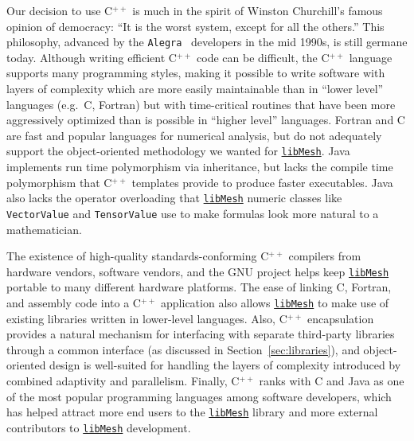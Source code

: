 \documentclass[global,twocolumn,final]{svjour}
\newcommand{\libMesh}{\href{http://libmesh.sourceforge.net}{\texttt{lib\-Mesh}}}
\newcommand{\cpp}{C{\tiny$^{++}$}}
\newcommand{\ICESOnly}[1]{}     %
\begin{document}
Our decision to use \cpp{} is much in the spirit of Winston
Churchill's famous opinion of democracy: ``It is the worst system,
except for all the others.''  This philosophy, advanced by the
\texttt{Alegra}~\cite{Alegra} developers in the mid 1990s, is still
germane today.  Although writing efficient \cpp{} code can be
difficult, the \cpp{} language supports many programming styles, making it
possible to write software with layers of complexity which are more
easily maintainable than in
``lower level'' languages (e.g.\ C, Fortran)
but with time-critical routines that have been
more aggressively optimized than is possible in ``higher level''
languages.  Fortran and C are fast and popular languages for numerical
analysis, but do not adequately support the object-oriented
methodology we wanted for \libMesh.  Java implements run time
polymorphism via inheritance, but lacks the compile time polymorphism
that \cpp{} templates provide to produce faster executables. Java also
lacks the operator overloading that \libMesh{} numeric classes like
\texttt{Vector\-Value} and \texttt{Tensor\-Value} use to make formulas
look more natural to a mathematician.

The existence of high-quality standards-conforming \cpp{} compilers
from hardware vendors, software vendors, and the GNU project helps
keep \libMesh{} portable to many different hardware platforms.  The
ease of linking C, Fortran, and assembly code into a \cpp{}
application also allows \libMesh{} to make use of existing libraries
written in lower-level languages.  Also, \cpp{} encapsulation provides
a natural mechanism for interfacing with separate third-party
libraries through a common interface (as discussed in
Section~\ref{sec:libraries}), and object-oriented design is
well-suited for handling the layers of complexity introduced by
combined adaptivity and parallelism. \ICESOnly{There is a rich
selection of third party development tools available for \cpp{} as
well.  Profiling and performance monitoring classes are built into
\libMesh{}, for example, but fine grained performance optimization is
still most easily done with third party compiler and profiler
support.}  Finally, \cpp{} ranks with C and Java as one of the most
popular programming languages among software developers, which has
helped attract more end users to the \libMesh{} library and more
external contributors to \libMesh{} development.
\end{document}
